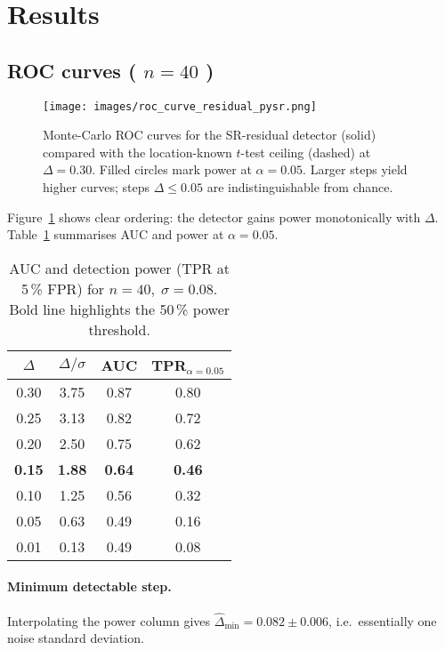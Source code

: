 \documentclass[11pt,a4paper]{article}
\begin{document}
\section{Results}
\subsection{ROC curves ( \texorpdfstring{$n=40$}{n=40} )}
\label{ssec:roc40}

\begin{figure}[!ht]
  \centering
  \texttt{[image: images/roc\_curve\_residual\_pysr.png]}
  \caption{Monte-Carlo ROC curves for the SR-residual detector (solid)
  compared with the location-known \(t\)-test ceiling (dashed) at
  \(\Delta=0.30\).  Filled circles mark power at
  \(\alpha=0.05\).  Larger steps yield higher curves; steps
  \(\Delta\le0.05\) are indistinguishable from chance.}
  \label{fig:roc}
\end{figure}

Figure~\ref{fig:roc} shows clear ordering: the detector gains power
monotonically with \(\Delta\).  Table~\ref{tab:power} summarises AUC and
power at \(\alpha=0.05\).

\begin{table}[h!]
\centering
\caption{AUC and detection power (TPR at 5\,\% FPR) for
\(n=40,\;\sigma=0.08\).  Bold line highlights the 50\,\% power
threshold.}
\label{tab:power}
\begin{tabular}{cccc}
\toprule
\(\Delta\) & \(\Delta/\sigma\) & AUC & TPR\(_{\alpha=0.05}\) \\ \midrule
0.30 & 3.75 & 0.87 & 0.80 \\
0.25 & 3.13 & 0.82 & 0.72 \\
0.20 & 2.50 & 0.75 & 0.62 \\ \midrule
\textbf{0.15} & \textbf{1.88} & \textbf{0.64} & \textbf{0.46} \\ \midrule
0.10 & 1.25 & 0.56 & 0.32 \\
0.05 & 0.63 & 0.49 & 0.16 \\
0.01 & 0.13 & 0.49 & 0.08 \\
\bottomrule
\end{tabular}
\end{table}

\paragraph{Minimum detectable step.}
Interpolating the power column gives
\(\widehat{\Delta}_{\min}=0.082\pm0.006\), i.e.\ essentially one noise
standard deviation.
\end{document}
